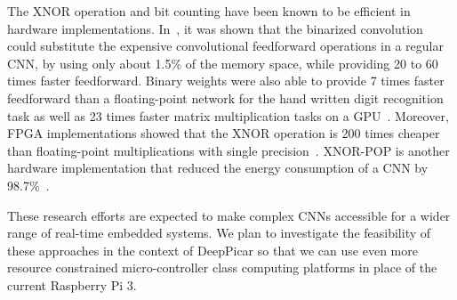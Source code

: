 The XNOR operation and bit counting have been known to be efficient in
hardware implementations. In~\cite{rastegari2016xnor}, it was shown
that the binarized convolution could substitute the expensive
convolutional feedforward operations in a regular CNN, by using only
about 1.5\% of the memory space, while
providing 20 to 60 times faster feedforward. Binary weights were also
able to provide 7 times faster feedforward than a floating-point
network for the hand written digit recognition task as well as 23
times faster matrix multiplication tasks on a
GPU~\cite{hubara2016binarized}.
Moreover, FPGA implementations showed that the XNOR operation is 200
times cheaper than floating-point multiplications with
single precision~\cite{beauchamp2006embedded,govindu2004analysis}.
XNOR-POP is another hardware implementation that reduced
the energy consumption of a CNN by 98.7\%~\cite{jiang2017xnor}.

These research efforts are expected to make complex CNNs accessible
for a wider range of real-time embedded systems. We plan to
investigate the feasibility of these approaches in the context of
DeepPicar so that we can use even more resource constrained
micro-controller class computing platforms in place of the current
Raspberry Pi 3.



